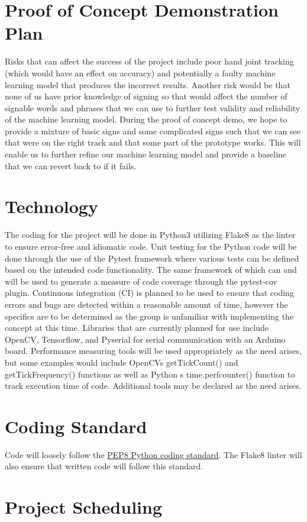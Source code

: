 \documentclass{article}
\begin{document}
\section{Proof of Concept Demonstration Plan}

Risks that can affect the success of the project include poor hand joint tracking
(which would have an effect on accuracy) and potentially a faulty machine learning model
that produces the incorrect results. Another risk would be that none of us have prior
knowledge of signing so that would affect the number of signable words and phrases that
we can use to further test validity and reliability of the machine learning model. During
the proof of concept demo, we hope to provide a mixture of basic signs and some complicated
signs such that we can see that we\textquotesingle re on the right track and that some part of the prototype
works. This will enable us to further refine our machine learning model and provide a
baseline that we can revert back to if it fails.

\section{Technology}

The coding for the project will be done in Python3 utilizing Flake8 as the linter
to ensure error-free and idiomatic code. Unit testing for the Python code will be done
through the use of the Pytest framework where various tests can be defined based on the
intended code functionality. The same framework of which can and will be used to generate
a measure of code coverage through the pytest-cov plugin. Continuous integration (CI) is
planned to be used to ensure that coding errors and bugs are detected within a reasonable
amount of time, however the specifics are to be determined as the group is unfamiliar with
implementing the concept at this time. Libraries that are currently planned for use include
OpenCV, Tensorflow, and Pyserial for serial communication with an Arduino board. Performance
measuring tools will be used appropriately as the need arises, but some examples would include
OpenCV\textquotesingle s getTickCount() and getTickFrequency() functions as well as Python\textquotesingle
s time.perf\textunderscore counter() function to track execution time of code. Additional tools
may be declared as the need arises.

\section{Coding Standard}

Code will loosely follow the \href{https://peps.python.org/pep-0008/}{PEP8 Python coding standard}.
The Flake8 linter will also ensure that written code will follow this standard.

\section{Project Scheduling}

\end{document}
